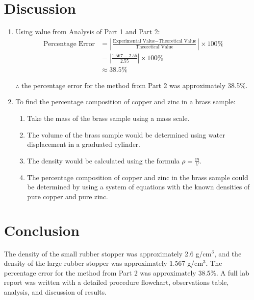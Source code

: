 \documentclass{article}
\begin{document}
\section{Discussion}


\begin{enumerate}
    \item 
    Using value from Analysis of Part 1 and Part 2:
    \begin{align*}
        \text{Percentage Error} &= \left| \frac{\text{Experimental Value} - \text{Theoretical Value}}{\text{Theoretical Value}} \right| \times 100\% \\
        &= \left| \frac{1.567 - 2.55}{2.55} \right| \times 100\% \\
        &\approx 38.5\%
    \end{align*}
    
    $\therefore$ the percentage error for the method from Part 2 was approximately 38.5\%.
    
    \item 
    To find the percentage composition of copper and zinc in a brass sample:
    \begin{enumerate}
        \item Take the mass of the brass sample using a mass scale.
        \item The volume of the brass sample would be determined using water displacement in a graduated cylinder.
        \item The density would be calculated using the formula $\rho = \frac{m}{V}$.
        \item The percentage composition of copper and zinc in the brass sample could be determined by using a system of equations with the known densities of pure copper and pure zinc.
    \end{enumerate}
\end{enumerate}
\newpage
\section{Conclusion}
The density of the small rubber stopper was approximately 2.6 g/cm$^3$, and the density of the large rubber stopper was approximately 1.567 g/cm$^3$. The percentage error for the method from Part 2 was approximately 38.5\%. A full lab report was written with a detailed procedure flowchart, observations table, analysis, and discussion of results.
\end{document}
